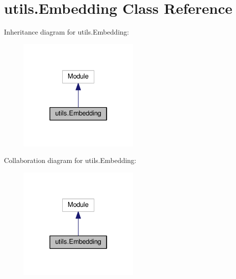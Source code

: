 \hypertarget{classutils_1_1Embedding}{}\section{utils.\+Embedding Class Reference}
\label{classutils_1_1Embedding}


Inheritance diagram for utils.\+Embedding\+:
\nopagebreak
\begin{figure}[H]
\begin{center}
\leavevmode
\includegraphics[width=166pt]{classutils_1_1Embedding__inherit__graph}
\end{center}
\end{figure}


Collaboration diagram for utils.\+Embedding\+:
\nopagebreak
\begin{figure}[H]
\begin{center}
\leavevmode
\includegraphics[width=166pt]{classutils_1_1Embedding__coll__graph}
\end{center}
\end{figure}
